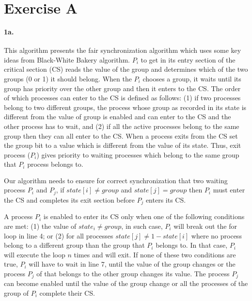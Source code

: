 \section*{Exercise A}

\paragraph{1a.}
This algorithm presents the fair synchronization algorithm which uses
some key ideas from Black-White Bakery algorithm. $P_i$ to get in its
entry section of the critical section (CS) reads the value of the
group and determines which of the two groups (0 or 1) it should
belong. When the $P_i$ chooses a group, it waits until its group has
priority over the other group and then it enters to the CS. 
The order of which processes can enter to the CS is defined as
follows:%
(1) if two processes belong to two different groups, the process whose
group as recorded in its state is different from the value of group is
enabled and can enter to the CS and the other process has to wait, and
%
(2) if all the active processes belong to the same group then they can
all enter to the CS.
When a process exits from the CS set the group bit to a value which is
different from the value of its state. Thus, exit process ($P_i$)
gives priority to waiting processes which belong to the same group
that $P_i$ process belongs to.

\bigskip
Our algorithm needs to ensure for correct synchronization that two
waiting process $P_i$ and $P_j$, if $state[i] \neq group$ and
$state[j] = group$ then $P_i$ must enter the CS and completes its exit
section before $P_j$ enters its CS. 

\bigskip
A process $P_i$ is enabled to
enter its CS only when one of the following conditions are met: %
(1) the value of $state_i \neq group$, in such case, $P_i$ will break
out the for loop in line 4; or %
(2) for all processes $state[j] \neq 1 - state[i]$ where no process
belong to a different group than the group that $P_i$ belongs to. In
that case, $P_i$ will execute the loop $n$ times and will exit.
If none of these two conditions are true, $P_i$ will have to wait in
line 7, until the value of the group changes or the process $P_j$ of
that belongs to the other group changes its value.
The process $P_j$ can become enabled until the value of the group
change or all the processes of the group of $P_i$ complete their CS.

